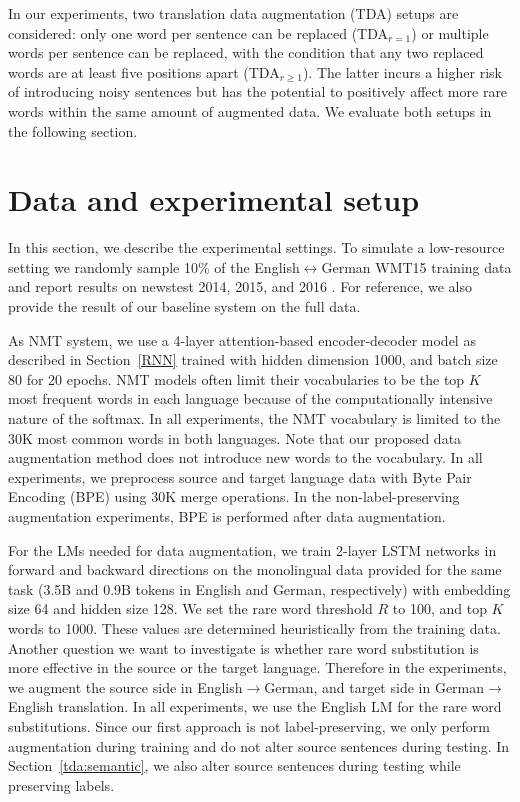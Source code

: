 In our experiments, two translation data augmentation (TDA) setups are considered: only one word per sentence can be replaced (TDA$_{r=1}$) or multiple words per sentence can be replaced, with the condition that any two replaced words are at least five positions apart (TDA$_{r\ge1}$).
The latter incurs a higher risk of introducing noisy sentences but has the potential to positively affect more rare words within the same amount of augmented data. 
We evaluate both setups in the following section.


%

\section{Data and experimental setup} \label{tda:exp}

In this section, we describe the experimental settings.
To simulate a low-resource setting we randomly sample 10\% of the English$\leftrightarrow$German WMT15 training data and report results on newstest 2014, 2015, and 2016 \citep{bojar-EtAl:2016:WMT1}. 
For reference, we also provide the result of our baseline system on the full data.

As NMT system, we use a 4-layer attention-based encoder-decoder model as described in Section~\ref{RNN} trained with hidden dimension 1000, and batch size 80 
for 20 epochs.
NMT models often limit their vocabularies to be the top $K$ most frequent words in each language because of the computationally intensive nature of the softmax.
In all experiments, the NMT vocabulary is limited to the 30K most common words in both languages.
Note that our proposed data augmentation method does not introduce new words to the vocabulary.
%
In all experiments, we preprocess source and target language data with Byte Pair Encoding (BPE) \citep{sennrich-haddow-birch:2016:P16-12} using 30K merge operations. 
In the non-label-preserving augmentation experiments, BPE is performed after data augmentation. %

For the LMs needed for data augmentation, we train 2-layer LSTM networks in forward and backward directions on the monolingual data provided for the same task 
(3.5B and 0.9B tokens in English and German, respectively) 
with embedding size 64 and hidden size 128.
%
We set the rare word threshold $R$ to 100, and top $K$ words to 1000. 
These values are determined heuristically from the training data.
%
Another question we want to investigate is whether rare word substitution is more effective in the source or the target language. 
Therefore in the experiments, we augment the source side in English$\rightarrow$German, and target side in German$\rightarrow$English translation. 
In all experiments, we use the English LM for the rare word substitutions.
Since our first approach is not label-preserving, we only perform augmentation during training and do not alter source sentences during testing.
In Section~\ref{tda:semantic}, we also alter source sentences during testing while preserving labels.


